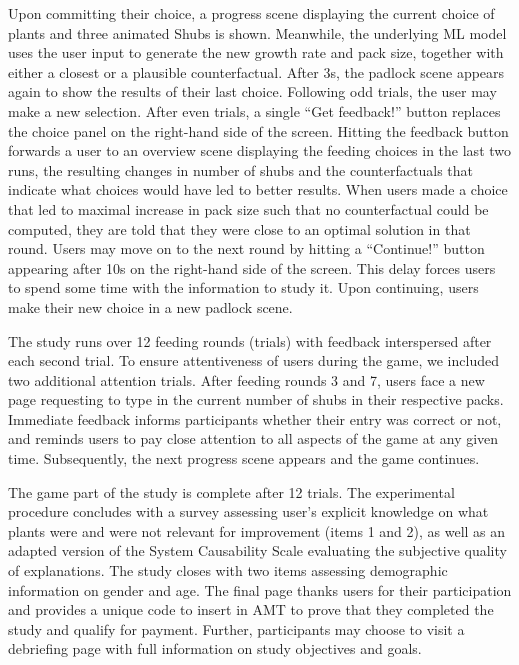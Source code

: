 Upon committing their choice, a progress scene displaying the current choice of plants and three animated Shubs is shown. 
Meanwhile, the underlying \gls{ML} model uses the user input to generate the new growth rate and pack size, together with either a closest or a plausible counterfactual.
After 3s, the padlock scene appears again to show the results of their last choice. 
Following odd trials, the user may make a new selection. 
After even trials, a single ``Get feedback!'' button replaces the choice panel on the right-hand side of the screen.
Hitting the feedback button forwards a user to an overview scene displaying the feeding choices in the last two runs, the resulting changes in number of shubs and the counterfactuals that indicate what choices would have led to better results. 
When users made a choice that led to maximal increase in pack size such that no counterfactual could be computed, they are told that they were close to an optimal solution in that round. 
Users may move on to the next round by hitting a ``Continue!'' button appearing after 10s on the right-hand side of the screen. This delay forces users to spend some time with the information to study it. Upon continuing, users make their new choice in a new padlock scene.

The study runs over 12 feeding rounds (trials) with feedback interspersed after each second trial. 
To ensure attentiveness of users during the game, we included two additional attention trials.
After feeding rounds 3 and 7, users face a new page requesting to type in the current number of shubs in their respective packs.
Immediate feedback informs participants whether their entry was correct or not, and reminds users to pay close attention to all aspects of the game at any given time.
Subsequently, the next progress scene appears and the game continues. 

The game part of the study is complete after 12 trials.
The experimental procedure concludes with a survey assessing user's explicit knowledge on what plants were and were not relevant for improvement (items 1 and 2), as well as an adapted version of the System Causability Scale \cite{holzinger_measuring_2020} evaluating the subjective quality of explanations.
The study closes with two items assessing demographic information on gender and age.
The final page thanks users for their participation and provides a unique code to insert in \gls{AMT} to prove that they completed the study and qualify for payment. 
Further, participants may choose to visit a debriefing page with full information on study objectives and goals. 

